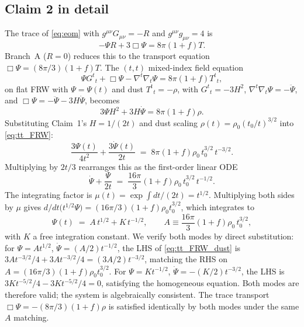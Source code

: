 \documentclass[aps,prd,twocolumn,nofootinbib,floatfix,superscriptaddress]{revtex4-2}
\begin{document}
\subsection{Claim 2 in detail}
\label{sec:claim2}

The trace of \eqref{eq:eom} with $g^{\mu\nu}G_{\mu\nu} = -R$ and
$g^{\mu\nu}g_{\mu\nu} = 4$ is
\begin{equation}
-\Psi R + 3\Box\Psi = 8\pi(1+f)T.
\end{equation}
Branch~A ($R = 0$) reduces this to the transport equation
$\Box\Psi = (8\pi/3)(1+f)T$. The $(t,t)$ mixed-index field equation
\begin{equation}
\Psi G^t{}_t + \Box\Psi - \nabla^t\nabla_t\Psi = 8\pi(1+f)T^t{}_t,
\end{equation}
on flat FRW with $\Psi = \Psi(t)$ and dust $T^t{}_t = -\rho$, with
$G^t{}_t = -3H^2$, $\nabla^t\nabla_t\Psi = -\ddot\Psi$, and
$\Box\Psi = -\ddot\Psi - 3H\dot\Psi$, becomes
\begin{equation}
\label{eq:tt_FRW_full}
3\Psi H^2 + 3H\dot\Psi = 8\pi(1+f)\rho.
\end{equation}
Substituting Claim~1's $H = 1/(2t)$ and dust scaling
$\rho(t) = \rho_0(t_0/t)^{3/2}$ into \eqref{eq:tt_FRW}:
\begin{equation}
\label{eq:tt_FRW_dust}
\frac{3\Psi(t)}{4t^2} + \frac{3\dot\Psi(t)}{2t}
\;=\; 8\pi(1+f)\rho_0\,t_0^{3/2}\,t^{-3/2}.
\end{equation}
Multiplying by $2t/3$ rearranges this as the first-order linear
ODE
\begin{equation}
\label{eq:psi_ode_app}
\dot\Psi + \frac{\Psi}{2t} \;=\; \frac{16\pi}{3}(1{+}f)\rho_0\,t_0^{3/2}\,t^{-1/2}.
\end{equation}
The integrating factor is $\mu(t) = \exp\!\int dt/(2t) = t^{1/2}$.
Multiplying both sides by $\mu$ gives
$d/dt\bigl(t^{1/2}\Psi\bigr) = (16\pi/3)(1{+}f)\rho_0 t_0^{3/2}$,
which integrates to
\begin{equation}
\label{eq:psi_general_app}
\Psi(t) \;=\; A\,t^{1/2} + K\,t^{-1/2},
\qquad
A \equiv \frac{16\pi}{3}(1{+}f)\rho_0\,t_0^{3/2},
\end{equation}
with $K$ a free integration constant. We verify both modes by
direct substitution: for $\Psi = A t^{1/2}$,
$\dot\Psi = (A/2)t^{-1/2}$, the LHS of \eqref{eq:tt_FRW_dust} is
$3At^{-3/2}/4 + 3At^{-3/2}/4 = (3A/2)t^{-3/2}$, matching the RHS
on $A = (16\pi/3)(1{+}f)\rho_0 t_0^{3/2}$. For $\Psi = Kt^{-1/2}$,
$\dot\Psi = -(K/2)t^{-3/2}$, the LHS is
$3Kt^{-5/2}/4 - 3Kt^{-5/2}/4 = 0$, satisfying the homogeneous
equation. Both modes are therefore valid; the system is
algebraically consistent. The trace transport
$\Box\Psi = -(8\pi/3)(1{+}f)\rho$ is satisfied identically by both
modes under the same $A$ matching.
\end{document}
